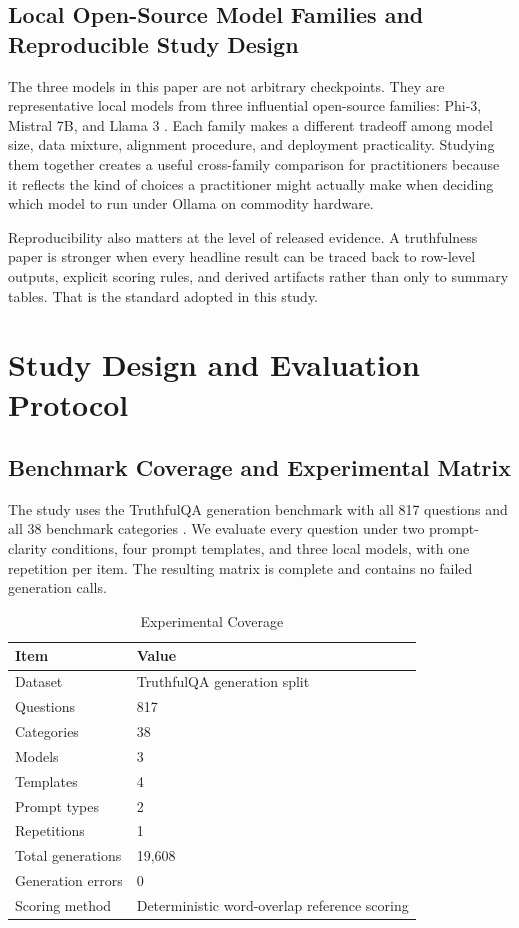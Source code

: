 \documentclass[conference]{IEEEtran}
\begin{document}
\subsection{\textbf{Local Open-Source Model Families and Reproducible Study Design}}

The three models in this paper are not arbitrary checkpoints. They are representative local models from three influential open-source families: Phi-3, Mistral 7B, and Llama 3 \cite{phi3_report,mistral7b,llama3herd}. Each family makes a different tradeoff among model size, data mixture, alignment procedure, and deployment practicality. Studying them together creates a useful cross-family comparison for practitioners because it reflects the kind of choices a practitioner might actually make when deciding which model to run under Ollama on commodity hardware.

Reproducibility also matters at the level of released evidence. A truthfulness paper is stronger when every headline result can be traced back to row-level outputs, explicit scoring rules, and derived artifacts rather than only to summary tables. That is the standard adopted in this study.

\section{\textbf{Study Design and Evaluation Protocol}}

\subsection{\textbf{Benchmark Coverage and Experimental Matrix}}

The study uses the TruthfulQA generation benchmark with all 817 questions and all 38 benchmark categories \cite{truthfulqa}. We evaluate every question under two prompt-clarity conditions, four prompt templates, and three local models, with one repetition per item. The resulting matrix is complete and contains no failed generation calls.

\begin{table}[t]
\centering
\caption{Experimental Coverage}
\label{tab:coverage}
\begin{tabular}{ll}
\toprule
\textbf{Item} & \textbf{Value} \\
\midrule
Dataset & TruthfulQA generation split \\
Questions & 817 \\
Categories & 38 \\
Models & 3 \\
Templates & 4 \\
Prompt types & 2 \\
Repetitions & 1 \\
Total generations & 19,608 \\
Generation errors & 0 \\
Scoring method & Deterministic word-overlap reference scoring \\
\bottomrule
\end{tabular}
\end{table}
\end{document}
